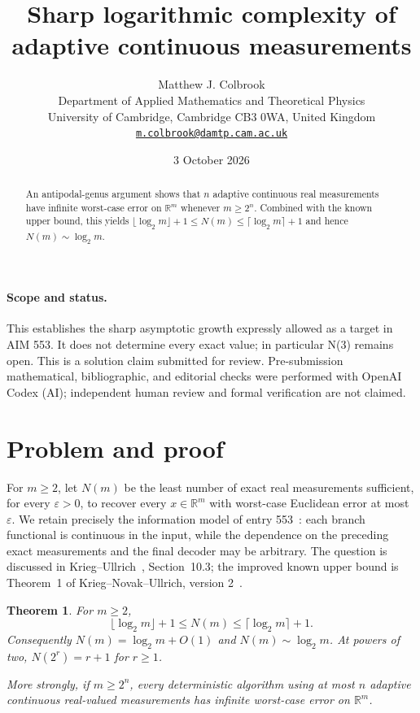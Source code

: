 \documentclass[11pt,a4paper]{article}
\newtheorem{theorem}{Theorem}[section]
\theoremstyle{remark}
\newcommand{\R}{\mathbb R}
\begin{document}
\title{Sharp logarithmic complexity of adaptive continuous measurements}
\author{Matthew J. Colbrook\\[3pt]\small Department of Applied Mathematics and Theoretical Physics\\\small University of Cambridge, Cambridge CB3 0WA, United Kingdom\\\small\href{mailto:m.colbrook@damtp.cam.ac.uk}{\texttt{m.colbrook@damtp.cam.ac.uk}}}
\date{3 October 2026}
\maketitle
\begin{abstract}An antipodal-genus argument shows that $n$ adaptive continuous real measurements have infinite worst-case error on $\mathbb R^m$ whenever $m\ge 2^n$. Combined with the known upper bound, this yields $\lfloor\log_2m\rfloor+1\le N(m)\le\lceil\log_2m\rceil+1$ and hence $N(m)\sim\log_2m$.\end{abstract}
\paragraph{Scope and status.} This establishes the sharp asymptotic growth expressly allowed as a target in AIM 553. It does not determine every exact value; in particular N(3) remains open. This is a solution claim submitted for review. Pre-submission mathematical, bibliographic, and editorial checks were performed with OpenAI Codex (AI); independent human review and formal verification are not claimed.

\section{Problem and proof}\label{sec:adaptive}

For $m\ge2$, let $N(m)$ be the least number of exact real measurements sufficient, for every $\varepsilon>0$, to recover every $x\in\R^m$ with worst-case Euclidean error at most $\varepsilon$. We retain precisely the information model of entry 553~\cite{repo553}: each branch functional is continuous in the input, while the dependence on the preceding exact measurements and the final decoder may be arbitrary. The question is discussed in Krieg--Ullrich~\cite{ku}, Section~10.3; the improved known upper bound is Theorem~1 of Krieg--Novak--Ullrich, version 2~\cite{knu}.

\begin{theorem}\label{thm:adaptive}
For $m\ge2$,
\[
 \boxed{\lfloor\log_2m\rfloor+1\le N(m)
 \le\lceil\log_2m\rceil+1.}
\]
Consequently $N(m)=\log_2m+O(1)$ and $N(m)\sim\log_2m$. At powers of two, $N(2^r)=r+1$ for $r\ge1$.

More strongly, if $m\ge2^n$, every deterministic algorithm using at most $n$ adaptive continuous real-valued measurements has infinite worst-case error on $\R^m$.
\end{theorem}
\end{document}
